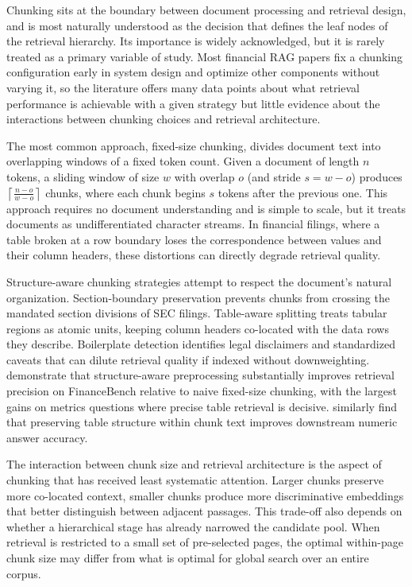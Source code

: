 \documentclass[12pt,twoside,maitrise]{dms}
\theoremstyle{definition}
\numberwithin{equation}{section}
\numberwithin{table}{chapter}
\numberwithin{figure}{chapter}
\begin{document}
Chunking sits at the boundary between document processing and retrieval design, and is
most naturally understood as the decision that defines the leaf nodes of the retrieval
hierarchy. Its importance is widely acknowledged, but it is rarely treated as a primary
variable of study. Most financial RAG papers fix a chunking configuration early in system design
and optimize other components without varying it, so the literature offers many data
points about what retrieval performance is achievable with a given strategy but little
evidence about the interactions between chunking choices and retrieval architecture.

The most common approach, fixed-size chunking, divides document text into overlapping
windows of a fixed token count. Given a document of length $n$ tokens, a sliding window of size $w$ with overlap $o$ (and stride $s = w - o$) produces $\left\lceil \frac{n - o}{w - o} \right\rceil$ chunks, where each chunk begins $s$ tokens after the previous one. This approach requires no document understanding and
is simple to scale, but it treats documents as undifferentiated character
streams. In financial filings, where a table broken at a row boundary loses the
correspondence between values and their column headers, these distortions can directly
degrade retrieval quality.

Structure-aware chunking strategies attempt to respect the document's natural
organization. Section-boundary preservation prevents chunks from crossing the mandated
section divisions of SEC filings. Table-aware splitting treats tabular regions as atomic
units, keeping column headers co-located with the data rows they describe. Boilerplate
detection identifies legal disclaimers and standardized caveats that can dilute retrieval
quality if indexed without downweighting. \citet{wang2024finsage} demonstrate that
structure-aware preprocessing substantially improves retrieval precision on FinanceBench
relative to naive fixed-size chunking, with the largest gains on metrics questions where
precise table retrieval is decisive. \citet{jimeno2024financial} similarly find that
preserving table structure within chunk text improves downstream numeric answer accuracy.

The interaction between chunk size and retrieval architecture is the aspect of chunking
that has received least systematic attention. Larger chunks preserve more co-located
context, smaller chunks produce more discriminative embeddings that better distinguish
between adjacent passages. This trade-off also depends on whether a hierarchical stage has already narrowed the candidate pool. When retrieval is restricted to a small set of pre-selected pages, the optimal within-page chunk size may differ from what is optimal for global search over an entire corpus.
\end{document}
